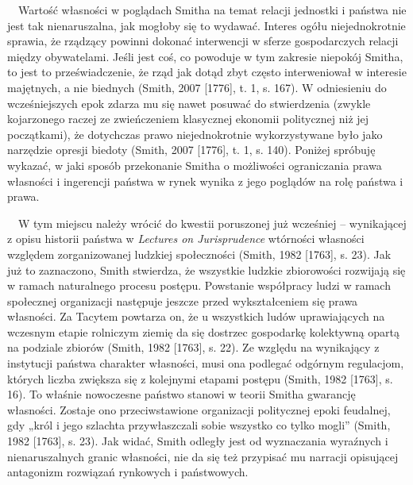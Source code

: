 \documentclass[a4paper]{article}
\begin{document}
\ \ Wartość własności w poglądach Smitha na temat relacji jednostki i państwa nie jest tak nienaruszalna, jak mogłoby
się to wydawać. Interes ogółu niejednokrotnie sprawia, że rządzący powinni dokonać interwencji w sferze gospodarczych
relacji między obywatelami. Jeśli jest coś, co powoduje w tym zakresie niepokój Smitha, to jest to przeświadczenie, że
rząd jak dotąd zbyt często interweniował w interesie majętnych, a nie biednych \label{ref:RNDKTNonQx9Ln}(Smith, 2007
[1776], t. 1, s. 167). W odniesieniu do wcześniejszych epok zdarza mu się nawet posuwać do stwierdzenia (zwykle
kojarzonego raczej ze zwieńczeniem klasycznej ekonomii politycznej niż jej początkami), że dotychczas prawo
niejednokrotnie wykorzystywane było jako narzędzie opresji biedoty \label{ref:RNDK2BdJNopfX}(Smith, 2007 [1776], t. 1,
s. 140). Poniżej spróbuję wykazać, w jaki sposób przekonanie Smitha o możliwości ograniczania prawa własności i
ingerencji państwa w rynek wynika z jego poglądów na rolę państwa i prawa.

\ \ W tym miejscu należy wrócić do kwestii poruszonej już wcześniej – wynikającej z opisu historii państwa w
\textit{Lectures on Jurisprudence} wtórności własności względem zorganizowanej ludzkiej społeczności
\label{ref:RNDH9LUKQOk30}(Smith, 1982 [1763], s. 23). Jak już to zaznaczono, Smith stwierdza, że wszystkie ludzkie
zbiorowości rozwijają się w ramach naturalnego procesu postępu. Powstanie współpracy ludzi w ramach społecznej
organizacji następuje jeszcze przed wykształceniem się prawa własności. Za Tacytem powtarza on, że u wszystkich ludów
uprawiających na wczesnym etapie rolniczym ziemię da się dostrzec gospodarkę kolektywną opartą na podziale zbiorów
\label{ref:RNDYghmRxhXTi}(Smith, 1982 [1763], s. 22). Ze względu na wynikający z instytucji państwa charakter
własności, musi ona podlegać odgórnym regulacjom, których liczba zwiększa się z kolejnymi etapami postępu
\label{ref:RND1yCVEykFX7}(Smith, 1982 [1763], s. 16). To właśnie nowoczesne państwo stanowi w teorii Smitha gwarancję
własności. Zostaje ono przeciwstawione organizacji politycznej epoki feudalnej, gdy „król i jego szlachta
przywłaszczali sobie wszystko co tylko mogli” \label{ref:RNDcpxaJZ2IE6}(Smith, 1982 [1763], s. 23). Jak widać, Smith
odległy jest od wyznaczania wyraźnych i nienaruszalnych granic własności, nie da się też przypisać mu narracji
opisującej antagonizm rozwiązań rynkowych i państwowych.
\end{document}
